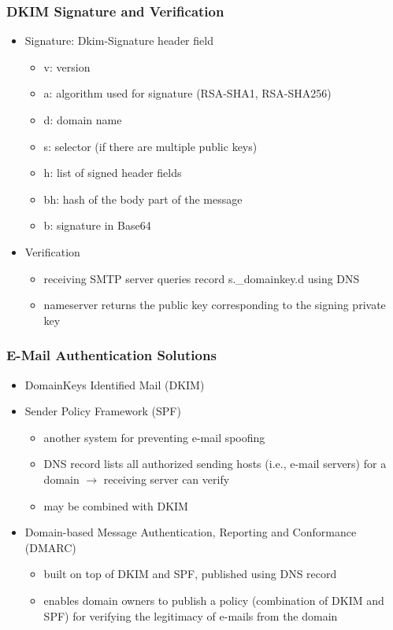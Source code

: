 \documentclass[final]{article}
\begin{document}
\subsubsection*{DKIM Signature and Verification}
\begin{itemize}[nosep]
    \item Signature: Dkim-Signature header field
          \begin{itemize}[nosep]
              \item v: version
              \item a: algorithm used for signature (RSA-SHA1, RSA-SHA256)
              \item d: domain name
              \item s: selector (if there are multiple public keys)
              \item h: list of signed header fields
              \item bh: hash of the body part of the message
              \item b: signature in Base64
          \end{itemize}
    \item Verification
          \begin{itemize}[nosep]
              \item receiving SMTP server queries record s.\_domainkey.d using DNS
              \item nameserver returns the public key corresponding to the signing private key
          \end{itemize}
\end{itemize}
\subsubsection*{E-Mail Authentication Solutions}
\begin{itemize}[nosep]
    \item DomainKeys Identified Mail (DKIM)
    \item Sender Policy Framework (SPF)
          \begin{itemize}[nosep]
              \item another system for preventing e-mail spoofing
              \item DNS record lists all authorized sending hosts (i.e., e-mail servers) for a domain $\rightarrow$ receiving server can verify
              \item may be combined with DKIM
          \end{itemize}
    \item Domain-based Message Authentication, Reporting and Conformance (DMARC)
          \begin{itemize}[nosep]
              \item built on top of DKIM and SPF, published using DNS record
              \item enables domain owners to publish a policy (combination of DKIM and SPF) for verifying the legitimacy of e-mails from the domain
          \end{itemize}
\end{itemize}
\end{document}
